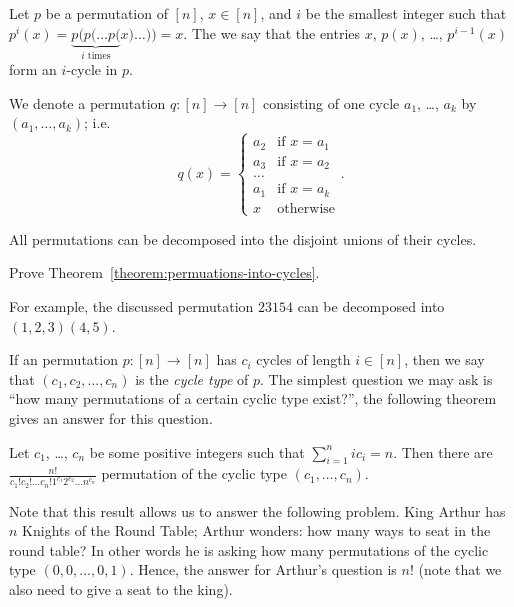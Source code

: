 \begin{definition}
  Let $p$ be a permutation of $[n]$, $x \in [n]$, and $i$ be the smallest
  integer such that
  $p^i(x) = \underbrace{p(p(\dots p(}_{i \text{ times}} x) \dots )) = x$.
  The we say that the entries $x$, $p(x)$, \dots, $p^{i - 1}(x)$ form an
  $i$-cycle in $p$.

  We denote a permutation $q : [n] \to [n]$ consisting of one cycle
  $a_1$, \dots, $a_k$ by $(a_1, \dots, a_k)$; i.e.
  \[
    q(x) =
    \begin{cases}
      a_2 & \text{if } x = a_1 \\
      a_3 & \text{if } x = a_2 \\
      \dots \\
      a_1 & \text{if } x = a_k \\
      x & \text{otherwise}
    \end{cases}.
  \]
\end{definition}

\begin{theorem}
\label{theorem:permuations-into-cycles}
  All permutations can be decomposed into the disjoint unions of their cycles.
\end{theorem}
\begin{exercise}
  Prove Theorem~\ref{theorem:permuations-into-cycles}.
\end{exercise}
For example, the discussed permutation $2 3 1 5 4$ can be decomposed into
$(1, 2, 3) (4, 5)$.

If an permutation $p : [n] \to [n]$ has $c_i$ cycles of length $i \in [n]$, then
we say that $(c_1, c_2, \dots, c_n)$ is the \emph{cycle type} of $p$.
The simplest question we may ask is ``how many permutations of a certain cyclic
type exist?'', the following theorem gives an answer for this question.
\begin{theorem}
  Let $c_1$, \dots, $c_n$ be some positive integers such that
  $\sum_{i = 1}^n i c_i = n$. Then there are
  $\frac{n!}{c_1! c_2! \dots c_n! 1^{c_1} 2^{c_2} \dots n^{c_n}}$
  permutation of the cyclic type $(c_1, \dots, c_n)$.
\end{theorem}

Note that this result allows us to answer the following problem. King Arthur has
$n$ Knights of the Round Table; Arthur wonders: how many ways to seat in the
round table? In other words he is asking how many permutations of the cyclic
type $(0, 0, \dots, 0, 1)$. Hence, the answer for Arthur's question is $n!$
(note that we also need to give a seat to the king).

